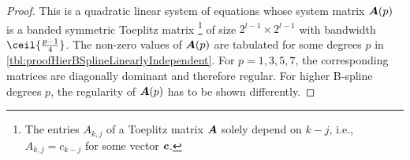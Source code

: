 \begin{proof}
  This is a quadratic linear system of equations
  whose system matrix
  ${\boldsymbol{A}}(p)$ is a banded symmetric Toeplitz matrix%
  \footnote{%
    The entries $A_{k,j}$ of a Toeplitz matrix ${\boldsymbol{A}}$
    solely depend on $k - j$, i.e.,
    $A_{k,j} = c_{k-j}$ for some vector ${\boldsymbol{c}}$.%
  }
  of size
  $2^{l-1} \times 2^{l-1}$ with bandwidth $\ceil{\tfrac{p-1}{4}}$.
  The non-zero values of ${\boldsymbol{A}}(p)$ are tabulated for some degrees $p$
  in \cref{tbl:proofHierBSplineLinearlyIndependent}.
  For $p = 1, 3, 5, 7$,
  the corresponding matrices are diagonally dominant and therefore regular.
  For higher B-spline degrees $p$, the regularity of ${\boldsymbol{A}}(p)$ has
  to be shown differently.
  

\end{proof}
